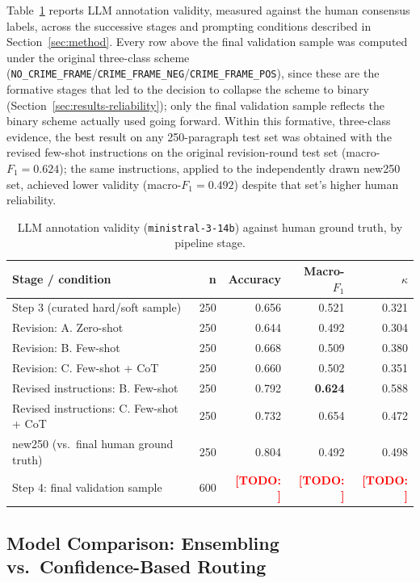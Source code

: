 \documentclass[a4paper,oneside,bibliography=totoc]{scrartcl}
\newcommand{\todo}[1]{\textcolor{red}{\textbf{[TODO: #1]}}}
\begin{document}
Table~\ref{tab:llm-validity} reports LLM annotation validity, measured against the human consensus labels, across the successive stages and prompting conditions described in Section~\ref{sec:method}. Every row above the final validation sample was computed under the original three-class scheme (\texttt{NO\_CRIME\_FRAME}/\texttt{CRIME\_FRAME\_NEG}/\texttt{CRIME\_FRAME\_POS}), since these are the formative stages that led to the decision to collapse the scheme to binary (Section~\ref{sec:results-reliability}); only the final validation sample reflects the binary scheme actually used going forward. Within this formative, three-class evidence, the best result on any 250-paragraph test set was obtained with the revised few-shot instructions on the original revision-round test set (macro-$F_1 = 0.624$); the same instructions, applied to the independently drawn new250 set, achieved lower validity (macro-$F_1 = 0.492$) despite that set's higher human reliability.

\begin{table}[htbp]
\centering
\begin{tabular}{lrrrr}
\toprule
\textbf{Stage / condition} & \textbf{n} & \textbf{Accuracy} & \textbf{Macro-$F_1$} & \textbf{$\kappa$} \\
\midrule
Step 3 (curated hard/soft sample) & 250 & 0.656 & 0.521 & 0.321 \\
Revision: A. Zero-shot              & 250 & 0.644 & 0.492 & 0.304 \\
Revision: B. Few-shot                & 250 & 0.668 & 0.509 & 0.380 \\
Revision: C. Few-shot + CoT          & 250 & 0.660 & 0.502 & 0.351 \\
Revised instructions: B. Few-shot      & 250 & 0.792 & \textbf{0.624} & 0.588 \\
Revised instructions: C. Few-shot + CoT & 250 & 0.732 & 0.654 & 0.472 \\
new250 (vs.\ final human ground truth) & 250 & 0.804 & 0.492 & 0.498 \\
Step 4: final validation sample & 600 & \todo{} & \todo{} & \todo{} \\
\bottomrule
\end{tabular}
\caption{LLM annotation validity (\texttt{ministral-3-14b}) against human ground truth, by pipeline stage.}
\label{tab:llm-validity}
\end{table}

\subsection{Model Comparison: Ensembling vs.\ Confidence-Based Routing}
\end{document}
